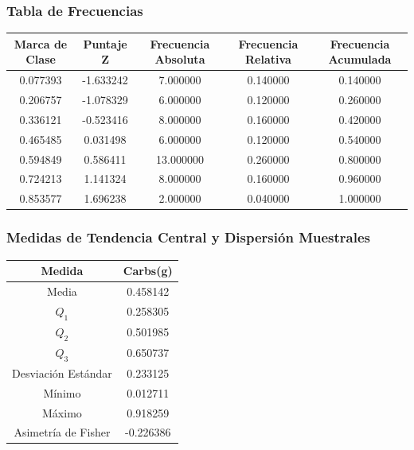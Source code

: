 \documentclass[12pt,a4paper]{article}
\begin{document}
    \subsubsection{Tabla de Frecuencias}
        \begin{center}
            \begin{tabular}{|c|c|c|c|c|}
                \hline
                Marca de Clase & Puntaje Z & Frecuencia Absoluta & Frecuencia Relativa & Frecuencia Acumulada \\
                \hline
                0.077393 & -1.633242 & 7.000000 & 0.140000 & 0.140000 \\
                0.206757 & -1.078329 & 6.000000 & 0.120000 & 0.260000 \\
                0.336121 & -0.523416 & 8.000000 & 0.160000 & 0.420000 \\
                0.465485 & 0.031498 & 6.000000 & 0.120000 & 0.540000 \\
                0.594849 & 0.586411 & 13.000000 & 0.260000 & 0.800000 \\
                0.724213 & 1.141324 & 8.000000 & 0.160000 & 0.960000 \\
                0.853577 & 1.696238 & 2.000000 & 0.040000 & 1.000000 \\
                \hline
            \end{tabular}
        \end{center}

    \subsubsection{Medidas de Tendencia Central y Dispersión Muestrales}
        \begin{center}
            \begin{tabular}{|c|c|}
                \hline
                Medida & Carbs(g) \\
                \hline
                Media & 0.458142  \\
                $Q_1$ & 0.258305 \\
                $Q_2$ & 0.501985 \\
                $Q_3$ & 0.650737 \\
                Desviación Estándar & 0.233125 \\
                Mínimo & 0.012711 \\
                Máximo & 0.918259 \\
                Asimetría de Fisher & -0.226386 \\
                \hline
            \end{tabular}
        \end{center}
\end{document}
